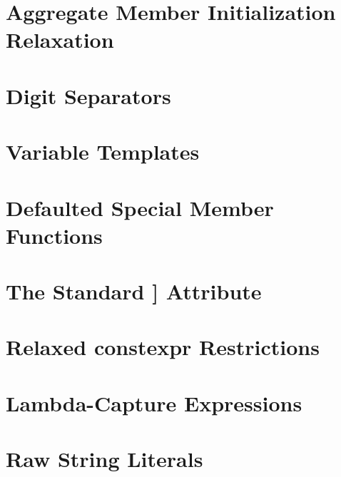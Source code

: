 
\newpage
\section[Aggregate Member Initialization Relaxation]{Aggregate Member Initialization Relaxation}\label{aggregate-member-initialization-relaxation}


\newpage
\section[Digit Separators]{Digit Separators}
\label{digitseparator} %
\label{digit-separators} %


\newpage
\section[Variable Templates]{Variable Templates}
\label{variable-templates}


\newpage
\section[Defaulted Special Member Functions]{Defaulted Special Member Functions}\label{Defaulted-Special-Member-Functions}\label{defaulted-special-member-functions}


\newpage
\section[{\tt [[deprecated]]}]{The Standard {\SecCode [[deprecated]]} Attribute\sectionmark{{\RHCode [[deprecated]]}}}\label{deprecated}\label{the-standard-[[deprecated]]-attribute}\sectionmark{{\RHCode [[deprecated]]}}


\newpage
\section[Relaxed {\ttfamily constexpr} Restrictions]{Relaxed {\SecCode constexpr} Restrictions}\label{relaxed-constexpr-restrictions}


\newpage
\section[Lambda-Capture Expressions]{Lambda-Capture Expressions}\label{lambda-capture-expressions}


\newpage
\section[Raw String Literals]{Raw String Literals}\label{raw-string-literals}




